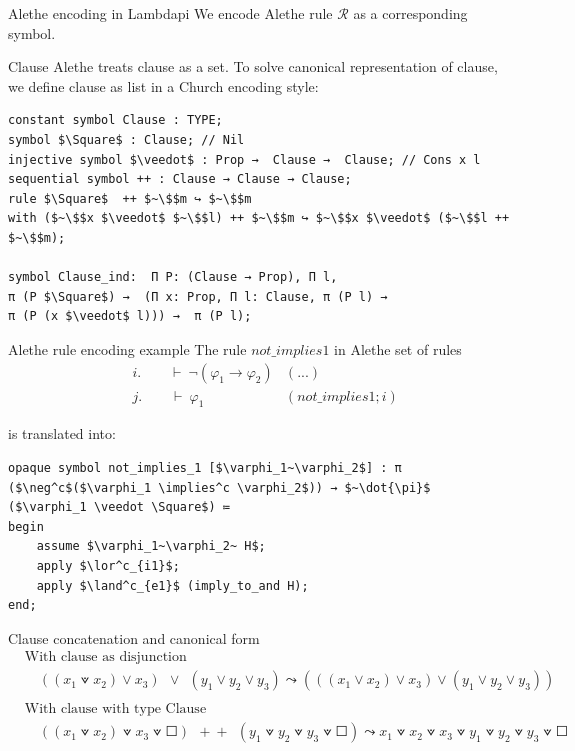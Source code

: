 \documentclass[aspectratio=169,xcolor={dvipsnames}]{beamer}
\begin{document}
\begin{frame}[t,fragile]{Alethe encoding in Lambdapi}
We encode Alethe rule $\mathcal{R}$ as a corresponding symbol.
\begin{block}{Clause}
Alethe treats clause as a set. To solve canonical representation of clause, we define clause as list in a Church encoding style:\\

\begin{lstlisting}[mathescape=true]
constant symbol Clause : TYPE;
symbol $\Square$ : Clause; // Nil
injective symbol $\veedot$ : Prop →  Clause →  Clause; // Cons x l
sequential symbol ++ : Clause → Clause → Clause;
rule $\Square$  ++ $~\$$m ↪ $~\$$m
with ($~\$$x $\veedot$ $~\$$l) ++ $~\$$m ↪ $~\$$x $\veedot$ ($~\$$l ++ $~\$$m);

symbol Clause_ind:  Π P: (Clause → Prop), Π l,
π (P $\Square$) →  (Π x: Prop, Π l: Clause, π (P l) →
π (P (x $\veedot$ l))) →  π (P l);
\end{lstlisting}
\end{block}
\end{frame}


\begin{frame}[t,fragile]{Alethe rule encoding example}
The rule $not\_implies1$ in Alethe set of rules
\begin{align*}
& i. \quad \quad \vdash~ \neg (\varphi_1 \rightarrow \varphi_2) &(...)\\
& j. \quad \quad \vdash~ \varphi_1  &(not\_implies1; i)
\end{align*}

is translated into:

\begin{lstlisting}[mathescape=true]
opaque symbol not_implies_1 [$\varphi_1~\varphi_2$] : π ($\neg^c$($\varphi_1 \implies^c \varphi_2$)) → $~\dot{\pi}$ ($\varphi_1 \veedot \Square$) ≔
begin
    assume $\varphi_1~\varphi_2~ H$;
    apply $\lor^c_{i1}$;
    apply $\land^c_{e1}$ (imply_to_and H);
end;
\end{lstlisting}
\end{frame}


\begin{frame}{Clause concatenation and canonical form}
\begin{align*}
&\text{With clause as disjunction}\\
&\quad ((x_1 \veedot x_2) \lor x_3) ~~\lor~~ (y_1 \lor y_2 \lor y_3) \leadsto (((x_1 \lor x_2) \lor x_3) \lor (y_1 \lor y_2 \lor y_3))\\  
&\\
&\text{With clause with type Clause}\\
&\quad ((x_1 \veedot x_2) \veedot x_3 \veedot \Square) ~~+\!+~~ (y_1 \veedot y_2 \veedot y_3 \veedot \Square) \leadsto x_1 \veedot x_2 \veedot x_3 \veedot y_1 \veedot y_2 \veedot y_3 \veedot \Square
\end{align*}
\end{frame}
\end{document}

